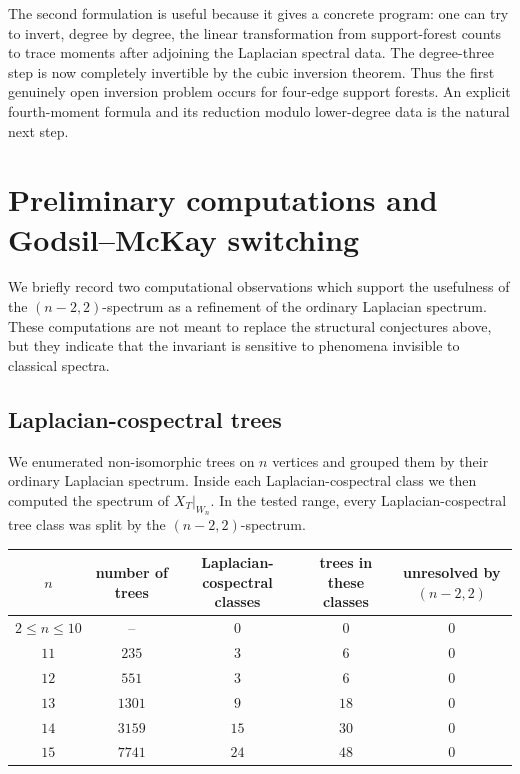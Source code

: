 \documentclass{amsart}
\theoremstyle{definition}
\begin{document}
The second formulation is useful because it gives a concrete program:
one can try to invert, degree by degree, the linear transformation from
support-forest counts to trace moments after adjoining the Laplacian spectral
data.  The degree-three step is now completely invertible by the cubic
inversion theorem.  Thus the first genuinely open inversion problem occurs
for four-edge support forests.  An explicit fourth-moment formula and its
reduction modulo lower-degree data is the natural next step.



\section{Preliminary computations and Godsil--McKay switching}

We briefly record two computational observations which support the usefulness
of the $(n-2,2)$-spectrum as a refinement of the ordinary Laplacian spectrum.
These computations are not meant to replace the structural conjectures above,
but they indicate that the invariant is sensitive to phenomena invisible to
classical spectra.

\subsection{Laplacian-cospectral trees}

We enumerated non-isomorphic trees on $n$ vertices and grouped them by their
ordinary Laplacian spectrum.  Inside each Laplacian-cospectral class we then
computed the spectrum of $X_T|_{W_n}$.  In the tested range, every
Laplacian-cospectral tree class was split by the $(n-2,2)$-spectrum.

\begin{center}
\small
\begin{tabular}{c|c|c|c|c}
$n$ & number of trees & Laplacian-cospectral classes & trees in these classes & unresolved by $(n-2,2)$ \\
\hline
$2\le n\le 10$ & -- & $0$ & $0$ & $0$ \\
$11$ & $235$ & $3$ & $6$ & $0$ \\
$12$ & $551$ & $3$ & $6$ & $0$ \\
$13$ & $1301$ & $9$ & $18$ & $0$ \\
$14$ & $3159$ & $15$ & $30$ & $0$ \\
$15$ & $7741$ & $24$ & $48$ & $0$
\end{tabular}
\end{center}
\end{document}

